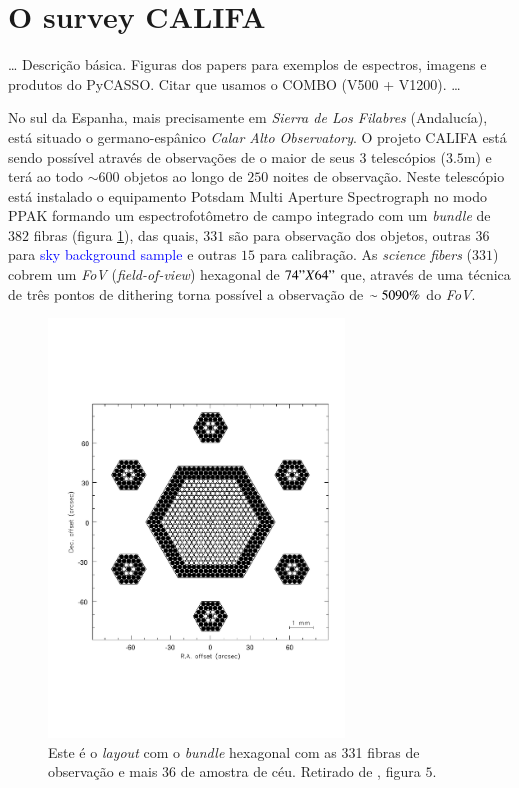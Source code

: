 \section{O survey CALIFA}
\label{sec:CALePyC:Apresent}

\ldots
Descrição básica. Figuras dos papers para exemplos de espectros, imagens e 
produtos do PyCASSO. Citar que usamos o COMBO (V500 + V1200).
\ldots

No sul da Espanha, mais precisamente em {\em Sierra de Los Filabres}
(Andalucía), está situado o germano-espânico {\em Calar Alto Observatory}. O
projeto CALIFA está sendo possível através de observações de o maior de seus
$3$ telescópios ($3.5$m) e terá ao todo $\sim600$ objetos ao longo de $250$
noites de observação. Neste telescópio está instalado o equipamento Potsdam
Multi Aperture Spectrograph \citep[PMAS; ][]{Roth2005} no modo PPAK
\citep{Verheijen2004, Kelz2006} formando um espectrofotômetro de campo
integrado com um {\em bundle} de $382$ fibras (figura \ref{fig:BundlePPAK}),
das quais, $331$ são para observação dos objetos, outras $36$ para \ojo
\textcolor{blue}{sky background sample} e outras $15$ para calibração. As {\em
science fibers} ($331$) cobrem um {\em FoV} ({\em field-of-view}) hexagonal de
$74" X 64"$ que, através de uma técnica de três pontos de dithering \ojo torna
possível a observação de $\sim50\-90\%$ do {\em FoV}.

\begin{figure}
    \includegraphics[width=0.7\textwidth]{figuras/Fig5.pdf}
    \caption[{\em Layout} do {\em bundle} de fibras do PPMAS/PPAK.]
    {Este é o {\em layout} com o {\em bundle} hexagonal com as 331 fibras de
    observação e mais 36 de amostra de céu. Retirado de \citet{Verheijen2004},
    figura $5$.}
    \label{fig:BundlePPAK}
\end{figure}


